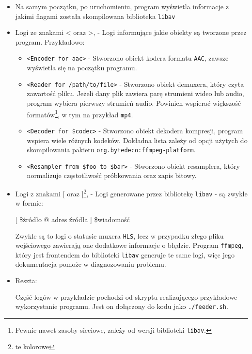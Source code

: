 \documentclass[a4paper,12pt]{article}
\begin{document}
\begin{itemize}
        \item Na samym początku, po uruchomieniu, program wyświetla informacje z
            jakimi flagami została skompilowana biblioteka \texttt{libav}
        \item Logi ze znakami < oraz >, - Logi informujące jakie obiekty są
            tworzone przez program. Przykładowo:
            \begin{itemize}
                \item \texttt{<Encoder for aac>} - Stworzono obiekt kodera
                    formatu \texttt{AAC}, zawsze wyświetla się na początku
                    programu.
                \item \texttt{<Reader for /path/to/file>} - Stworzono obiekt
                    demuxera, który czyta zawartość pliku. Jeżeli dany plik
                    zawiera parę strumieni wideo lub audio, program wybiera
                    pierwszy strumień audio. Powinien wspierać większość
                    formatów\footnote{Pewnie nawet zasoby sieciowe, zależy od wersji
                    biblioteki \texttt{libav}.}, w tym na przykład
                    \texttt{mp4}.
                \item \texttt{<Decoder for \$codec>} - Stworzono obiekt dekodera
                    kompresji, program wspiera wiele różnych kodeków. Dokładna
                    lista zależy od opcji użytych do skompilowania pakietu
                    \texttt{org.bytedeco:ffmpeg-platform}.
                \item \texttt{<Resampler from \$foo to \$bar>} - Stworzono
                    obiekt resamplera, który normalizuje częstotliwość
                    próbkowania oraz zapis bitowy.
            \end{itemize}
        \item Logi z znakami [ oraz ]\footnote{te kolorowe}, - Logi generowane przez bibliotekę
            \texttt{libav} - są zwykle w formie:

            \begin{center}
                [ \$źródło @ adres źródła ] \$wiadomość
            \end{center}
            
            Zwykle są to logi o statusie muxera \texttt{HLS}, lecz w przypadku
            złego pliku wejściowego zawierają one dodatkowe informacje o
            błędzie. Program \texttt{ffmpeg}, który jest frontendem do
            biblioteki \texttt{libav} generuje te same logi, więc jego
            dokumentacja pomoże w diagnozowaniu problemu.

        \item Reszta:

            Część logów w przykładzie pochodzi od skryptu realizującego
            przykładowe wykorzystanie programu. Jest on dołączony do kodu jako
            \texttt{./feeder.sh}.
\end{itemize}
\end{document}
